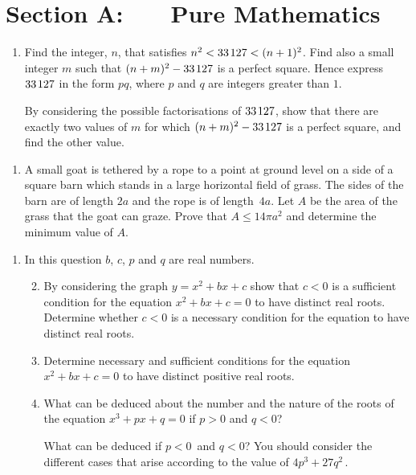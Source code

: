 \documentclass[a4, 11pt]{report}
\newlength{\qspace}
\newcounter{qnumber}
\newenvironment{question}%
 {\vspace{\qspace}
  \begin{enumerate}[\bfseries 1\quad][10]%
    \setcounter{enumi}{\value{qnumber}}%
    \item%
 }
{
  \end{enumerate}
  \filbreak
  \stepcounter{qnumber}
 }
\newenvironment{questionparts}[1][1]%
 {
  \begin{enumerate}[\bfseries (i)]%
    \setcounter{enumii}{#1}
    \addtocounter{enumii}{-1}
    \setlength{\itemsep}{5mm}
    \setlength{\parskip}{8pt}
 }
 {
  \end{enumerate}
 }
\def\le{\leqslant}
\begin{document}
\setcounter{page}{2}

 
\section*{Section A: \ \ \ Pure Mathematics}

\begin{question}
Find the integer, $n$, that satisfies  
$n^2 < 33\hspace{1.2pt}127< (n+1)^2$. Find
also a small integer $m$ such that $(n+m)^2 -33\hspace{1.2pt}127$
 is a perfect square.
Hence express $33\hspace{1.2pt}127$ in the form $pq$, where $p$ and $q$ are integers
greater than $1$. 

By considering the possible factorisations of $33\hspace{1.2pt}127$, show that
there are exactly two values of $m$ 
for which  $(n+m)^2 -33\hspace{1.2pt}127$ is a perfect square,
and find the other value.
\end{question}

\begin{question}
A small goat is tethered by a rope to a point at ground level on a
side of a 
square barn  which stands in a large horizontal field of grass. 
The sides of the barn are of length $2a$
and  the rope is of length~$4a$. 
Let $A$ be the area of the grass that the goat can
graze. Prove that $A\le14\pi a^2$ and determine the minimum value of
$A$.
\end{question}

\begin{question}
In this question $b$, $c$, $p$ and $q$ are real numbers.
\begin{questionparts}
\item By considering the graph $y=x^2 + bx + c$ 
show that $c < 0$ is a sufficient condition for the equation 
$\displaystyle x^2 + bx + c = 0$ to have distinct real roots. 
Determine whether $c < 0$ is a necessary condition for the 
equation to have distinct real roots.


\item
Determine necessary and 
sufficient conditions for the equation $\displaystyle x^2 + bx + c = 0$
to have  distinct positive real roots.


\item What can be deduced about the 
number and the nature of the roots of the equation 
$x^3 + px + q = 0$ if $p>0$ and $q<0$?

What can be deduced if $p<0\,$ and $q<0$? You should consider 
the different cases that arise according to the value of
$4p^3+ 27q^2\,$.

\end{questionparts}
\end{question}
\end{document}
